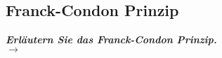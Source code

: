 \subsection{\label{subsec:FZV2}Franck-Condon Prinzip}
\textbf{\textit{Erläutern Sie das Franck-Condon Prinzip.}} \\
$\rightarrow$